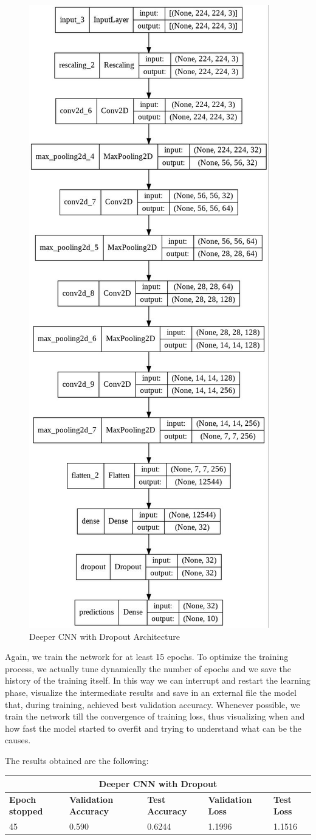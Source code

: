 \begin{figure}[H]
	\centering
	\includegraphics[height=0.6\textwidth]{img/scratch/DropoutCNN.jpg}
	\caption{Deeper CNN with Dropout Architecture}
	\label{fig: DeeperDropout}
\end{figure}

\noindent Again, we train the network for at least 15 epochs. To optimize the training process, we actually tune dynamically the number of epochs and we save the history of the training itself. In this way we can interrupt and restart the learning phase, visualize the intermediate results and save in an external file the model that, during training, achieved best validation accuracy. Whenever possible, we train the network till the convergence of training loss, thus visualizing when and how fast the model started to overfit and trying to understand what can be the causes.

\noindent The results obtained are the following:

\medskip

\begin{tabular}{ |p{2cm}|p{2cm}|p{2cm}|p{2cm}|p{2cm}|  }
\hline
\multicolumn{5}{|c|}{Deeper CNN with Dropout} \\
\hline
\textbf{Epoch stopped} & \textbf{Validation Accuracy} & \textbf{Test Accuracy} & \textbf{Validation Loss} & \textbf{Test Loss} \\
\hline
45 & 0.590 & 0.6244 & 1.1996 & 1.1516\\
\hline
\end{tabular}

\medskip


